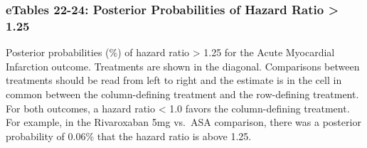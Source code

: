 \documentclass[
  12pt,
]{article}
\begin{document}
\begin{landscape}

\hypertarget{etables-22-24-posterior-probabilities-of-hazard-ratio-1.25}{%
\subsubsection{eTables 22-24: Posterior Probabilities of Hazard Ratio
\textgreater{}
1.25}\label{etables-22-24-posterior-probabilities-of-hazard-ratio-1.25}}

\begin{table}[!h]

\caption{\label{tab:unnamed-chunk-44}Acute Myocardial Infarction}
\centering
{}
\end{table}

Posterior probabilities (\%) of hazard ratio \textgreater{} 1.25 for the
Acute Myocardial Infarction outcome. Treatments are shown in the
diagonal. Comparisons between treatments should be read from left to
right and the estimate is in the cell in common between the
column-defining treatment and the row-defining treatment. For both
outcomes, a hazard ratio \textless{} 1.0 favors the column-defining
treatment. For example, in the Rivaroxaban 5mg vs.~ASA comparison, there
was a posterior probability of 0.06\% that the hazard ratio is above
1.25.

\end{landscape}

\begin{table}[!h]

\caption{\label{tab:unnamed-chunk-45}Ischemic Stroke}
\centering
{}
\end{table}
\end{document}
